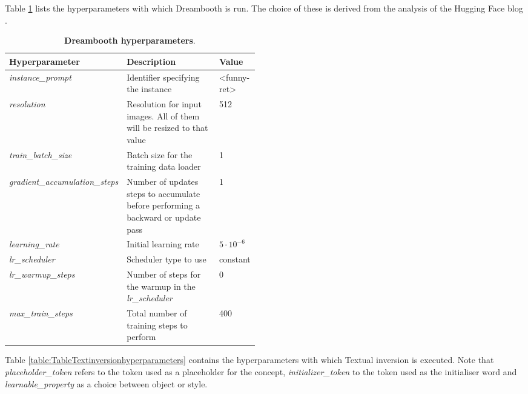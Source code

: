 Table \ref{table:TableDreamboothhyperparameters} lists the hyperparameters with which Dreambooth is run. The choice of these is derived from the analysis of the Hugging Face blog \cite{dreamboothdiffusers}.

\begin{table}[ht]
\centering
\begin{tabular}{|l|p{0.48\linewidth}|l|}
\hline
\rowcolor[HTML]{AEAAAA} 
\textbf{Hyperparameter} & \textbf{Description} & \textbf{Value} \\ \hline
\textit{instance\_prompt} & Identifier specifying the instance & \textless{}funny-ret\textgreater{} \\ \hline
\textit{resolution} & Resolution for input images. All of them will be resized to that value & 512 \\ \hline
\textit{train\_batch\_size} & Batch   size for the training data loader & 1 \\ \hline
\textit{gradient\_accumulation\_steps} & Number   of updates steps to accumulate before performing a backward or update pass & 1 \\ \hline
\textit{learning\_rate} & Initial learning rate & $5\cdot10^{-6}$ \\ \hline
\textit{lr\_scheduler} & Scheduler type to use & constant \\ \hline
\textit{lr\_warmup\_steps} & Number of steps for the warmup in the \textit{lr\_scheduler} & 0 \\ \hline
\textit{max\_train\_steps} & Total number of training steps to perform & 400 \\ \hline
\end{tabular}
\caption{\textbf{Dreambooth hyperparameters}.}
\label{table:TableDreamboothhyperparameters}
\end{table}

Table \ref{table:TableTextinversionhyperparameters} contains the hyperparameters with which Textual inversion is executed. Note that \textit{placeholder\_token} refers to the token used as a placeholder for the concept, \textit{initializer\_token} to the token used as the initialiser word and \textit{learnable\_property} as a choice between object or style.

